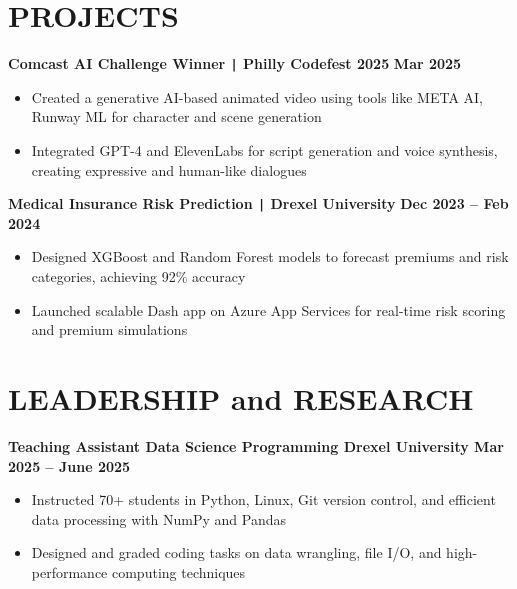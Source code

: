 \documentclass[10pt]{article}
\begin{document}
\vspace{-0.75cm}
\section*{PROJECTS}
\vspace{-0.1cm}

\noindent
\textbf{Comcast AI Challenge Winner \texttt{|} Philly Codefest 2025} \hfill \textbf{Mar 2025} \\
\vspace{-0.4cm}
\begin{itemize}[leftmargin=0.6cm, itemsep=-0.1cm, topsep=0cm]

    \item Created a generative AI-based animated video using tools like META AI, Runway ML for character and scene generation

    \item Integrated GPT-4 and ElevenLabs for script generation and voice synthesis, creating expressive and human-like dialogues

\end{itemize}

\noindent
\textbf{Medical Insurance Risk Prediction \texttt{|} Drexel University} \hfill \textbf{Dec 2023 -- Feb 2024} \\
\vspace{-0.4cm}
\begin{itemize}[leftmargin=0.6cm, itemsep=-0.1cm, topsep=0cm]

    \item Designed XGBoost and Random Forest models to forecast premiums and risk categories, achieving 92\% accuracy

    \item Launched scalable Dash app on Azure App Services for real-time risk scoring and premium simulations

\end{itemize}


\vspace{-0.4cm}
\section*{LEADERSHIP and RESEARCH}
\vspace{-0.1cm}

\noindent
\textbf{Teaching Assistant \textbar{} Data Science Programming \textbar{} Drexel University  \hfill Mar 2025 -- June 2025} \\
\vspace{-0.4cm}
\begin{itemize}[leftmargin=0.6cm, itemsep=-0.1cm, topsep=0cm]

    \item Instructed 70+ students in Python, Linux, Git version control, and efficient data processing with NumPy and Pandas

    \item Designed and graded coding tasks on data wrangling, file I/O, and high-performance computing techniques

\end{itemize}
\end{document}
